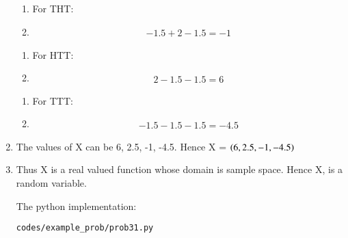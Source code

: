 \begin{enumerate}
\begin{enumerate}
\item For THT:
\item
\begin{align}
-1.5+2-1.5 = -1
\end{align}
\end{enumerate}

\begin{enumerate}
\item For HTT:
\item
\begin{align}
2-1.5-1.5 = 6
\end{align}
\end{enumerate}

\begin{enumerate}
\item For TTT:
\item
\begin{align}
-1.5-1.5-1.5 = -4.5
\end{align}
\end{enumerate}

\item The values of X can be 6, 2.5, -1, -4.5. Hence X = $\left(6, 2.5, -1, -4.5\right)$

\item Thus  X is a real valued function whose domain is sample space. Hence X, is a random variable.

The python implementation:
\begin{lstlisting}
codes/example_prob/prob31.py
\end{lstlisting}

\end{enumerate}